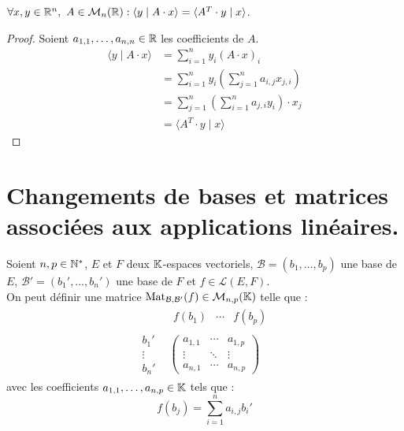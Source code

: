 \begin{lemma}
	 $\forall x, y \in \mathbb{R}^n,\ A \in \mathcal{M}_n(\mathbb{R}) : \langle y \mid A \cdot x \rangle = \langle A^T \cdot y \mid x \rangle$.
\end{lemma}

\begin{proof}
	Soient $a_{1,1}, \ldots, a_{n,n} \in \mathbb{R}$ les coefficients de $A$.
	\begin{align*}
		\langle y \mid A \cdot x \rangle &= \sum_{i = 1}^{n} y_i (A \cdot x)_i \\
		&= \sum_{i = 1}^{n} y_i \left( \sum_{j=1}^{n} a_{i,j} x_{j,i} \right) \\
		&= \sum_{j = 1}^{n} \left( \sum_{i = 1}^{n} a_{j,i} y_i \right) \cdot x_j \\
		&= \langle A^T \cdot y \mid x \rangle
	\end{align*}
\end{proof}

\section{Changements de bases et matrices associées aux applications linéaires.}

\begin{definition}
    Soient $n, p \in \mathbb{N}^*$, $E$ et $F$ deux $\mathbb{K}$-espaces vectoriels, $\mathcal{B} = (b_1, \ldots, b_p)$ une base de $E$, $\mathcal{B}' = (b_1', \ldots, b_n')$ une base de $F$ et $f \in \mathcal{L}(E, F)$.
    \\
    On peut définir une matrice $\operatorname{Mat}_{\mathcal{B},\mathcal{B}'} (f) \in \mathcal{M}_{n,p}(\mathbb{K})$ telle que :
    \begin{align*}
    	&\begin{matrix}
    		f(b_1) & \cdots & f(b_p) 
    	\end{matrix}
    	\\
        \begin{matrix}
            b_1' \\
            \vdots \\ 
            b_n'
        \end{matrix}
        &\begin{pmatrix}
            a_{1,1} & \cdots & a_{1,p} \\
            \vdots & \ddots & \vdots \\ 
            a_{n,1} & \cdots & a_{n,p}
        \end{pmatrix}
    \end{align*}
    avec les coefficients $a_{1,1}, \ldots, a_{n,p} \in \mathbb{K}$ tels que : 
    \[ f(b_j) = \sum_{i = 1}^n a_{i,j} b_i' \]
\end{definition}

